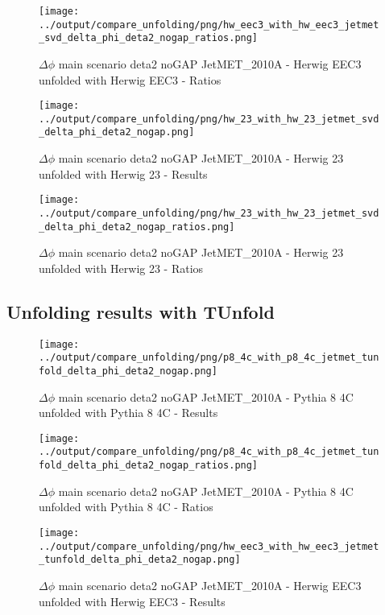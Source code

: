 \documentclass[11pt]{book}
\begin{document}
\begin{figure}[ht]
\centering
\texttt{[image: ../output/compare\_unfolding/png/hw\_eec3\_with\_hw\_eec3\_jetmet\_svd\_delta\_phi\_deta2\_nogap\_ratios.png]}
\caption{$\Delta\phi$ main scenario deta2 noGAP JetMET\_2010A - Herwig EEC3 unfolded with Herwig EEC3 - Ratios}
\label{hw_eec3_hw_eec3_jetmet_svd_delta_phi_deta2_nogap_b}
\end{figure}

\begin{figure}[ht]
\centering
\texttt{[image: ../output/compare\_unfolding/png/hw\_23\_with\_hw\_23\_jetmet\_svd\_delta\_phi\_deta2\_nogap.png]}
\caption{$\Delta\phi$ main scenario deta2 noGAP JetMET\_2010A - Herwig 23 unfolded with Herwig 23 - Results}
\label{hw_23_hw_23_jetmet_svd_delta_phi_deta2_nogap_a}
\end{figure}

\begin{figure}[ht]
\centering
\texttt{[image: ../output/compare\_unfolding/png/hw\_23\_with\_hw\_23\_jetmet\_svd\_delta\_phi\_deta2\_nogap\_ratios.png]}
\caption{$\Delta\phi$ main scenario deta2 noGAP JetMET\_2010A - Herwig 23 unfolded with Herwig 23 - Ratios}
\label{hw_23_hw_23_jetmet_svd_delta_phi_deta2_nogap_b}
\end{figure}


\clearpage
\subsection{Unfolding results with TUnfold}

\begin{figure}[ht]
\centering
\texttt{[image: ../output/compare\_unfolding/png/p8\_4c\_with\_p8\_4c\_jetmet\_tunfold\_delta\_phi\_deta2\_nogap.png]}
\caption{$\Delta\phi$ main scenario deta2 noGAP JetMET\_2010A - Pythia 8 4C unfolded with Pythia 8 4C - Results}
\label{p8_p8_jetmet_tunfold_delta_phi_deta2_nogap_a}
\end{figure}

\begin{figure}[ht]
\centering
\texttt{[image: ../output/compare\_unfolding/png/p8\_4c\_with\_p8\_4c\_jetmet\_tunfold\_delta\_phi\_deta2\_nogap\_ratios.png]}
\caption{$\Delta\phi$ main scenario deta2 noGAP JetMET\_2010A - Pythia 8 4C unfolded with Pythia 8 4C - Ratios}
\label{p8_p8_jetmet_tunfold_delta_phi_deta2_nogap_b}
\end{figure}

\begin{figure}[ht]
\centering
\texttt{[image: ../output/compare\_unfolding/png/hw\_eec3\_with\_hw\_eec3\_jetmet\_tunfold\_delta\_phi\_deta2\_nogap.png]}
\caption{$\Delta\phi$ main scenario deta2 noGAP JetMET\_2010A - Herwig EEC3 unfolded with Herwig EEC3 - Results}
\label{hw_eec3_hw_eec3_jetmet_tunfold_delta_phi_deta2_nogap_a}
\end{figure}
\end{document}
